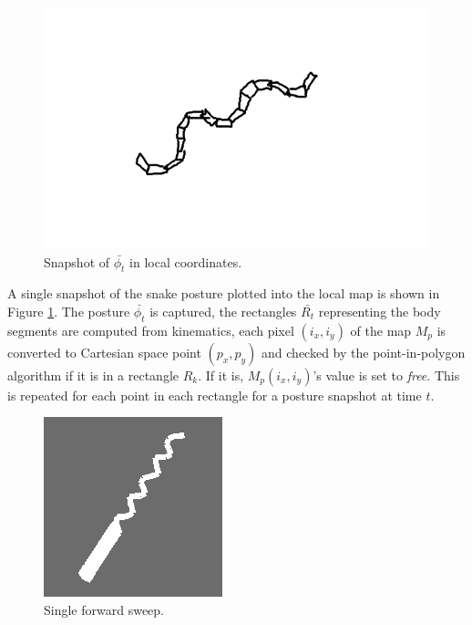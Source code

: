 \begin{figure}
  \begin{center}
    \includegraphics[scale=0.7]{4_snapshot_1.png}
  \end{center}
  \caption{Snapshot of $\bar{\phi_t}$ in local coordinates.}
	\label{snapshot}
\end{figure}


A single snapshot of the snake posture plotted into the local map is shown in Figure \ref{snapshot}.  The posture $\bar{\phi_t}$ is captured, the rectangles $\bar{R_t}$ representing the body segments are computed from kinematics, each pixel $(i_x,i_y)$ of the map $M_p$ is converted to Cartesian space point $(p_x,p_y)$ and checked by the point-in-polygon algorithm if it is in a rectangle $R_k$.  If it is, $M_p(i_x,i_y)$'s value is set to \emph{free}.  This is repeated for each point in each rectangle for a posture snapshot at time $t$.

\begin{figure}
  \begin{center}
    \includegraphics[scale=1.0]{localOccMapSingle0.png}
  \end{center}
  \caption{Single forward sweep. }
	\label{single_sweep}
\end{figure}

